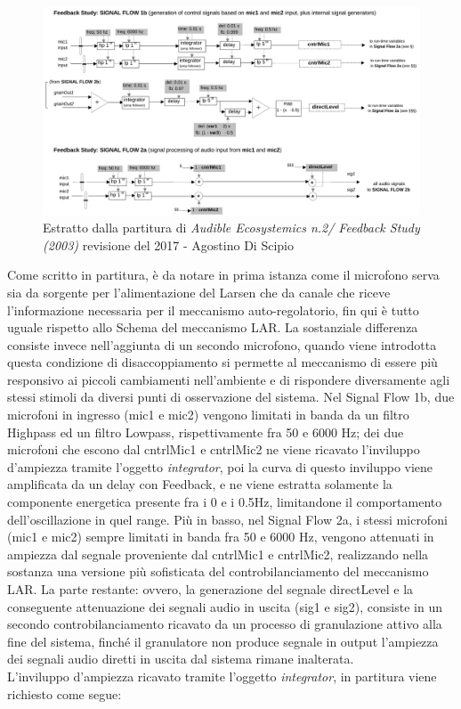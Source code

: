 \begin{figure}[h!]
\begin{center}
\includegraphics[width=14cm]{figures/LARFeedbackstudy2017.pdf}
\caption{Estratto dalla partitura di \textit{Audible Ecosystemics n.2/ Feedback Study (2003)}
revisione del 2017 - Agostino Di Scipio}
\vspace{0.5cm}
\end{center}
\end{figure}

Come scritto in partitura, è da notare in prima istanza
come il microfono serva sia da sorgente per l'alimentazione del Larsen che
da canale che riceve l'informazione necessaria per il meccanismo auto-regolatorio,
fin qui è tutto uguale rispetto allo Schema del meccanismo LAR.
La sostanziale differenza consiste invece nell'aggiunta di un secondo microfono,
quando viene introdotta questa condizione di disaccoppiamento si 
permette al meccanismo di essere più responsivo ai piccoli cambiamenti nell'ambiente
e di rispondere diversamente agli stessi stimoli da diversi punti di osservazione del sistema.
Nel Signal Flow 1b, due microfoni in ingresso (mic1 e mic2) 
vengono limitati in banda da un filtro Highpass ed 
un filtro Lowpass, rispettivamente fra 50 e 6000 Hz; dei due microfoni che escono 
dal cntrlMic1 e cntrlMic2 ne viene ricavato l'inviluppo d'ampiezza tramite
l'oggetto \textit{integrator}, poi la curva di questo inviluppo viene amplificata da 
un delay con Feedback, e ne viene estratta solamente la componente energetica 
presente fra i 0 e i 0.5Hz, limitandone il comportamento dell'oscillazione in quel range.
Più in basso, nel Signal Flow 2a, i stessi microfoni (mic1 e mic2) sempre
limitati in banda fra 50 e 6000 Hz, vengono attenuati in ampiezza dal segnale
proveniente dal cntrlMic1 e cntrlMic2, realizzando nella sostanza una 
versione più sofisticata del controbilanciamento del meccanismo LAR.
La parte restante: ovvero, la generazione del segnale directLevel e la 
conseguente attenuazione dei segnali audio in uscita (sig1 e sig2),
consiste in un secondo controbilanciamento ricavato da un processo di granulazione
attivo alla fine del sistema, finché il granulatore non produce segnale in output 
l'ampiezza dei segnali audio diretti in uscita dal sistema rimane inalterata. \\
L'inviluppo d'ampiezza ricavato tramite l'oggetto \textit{integrator}, in partitura 
viene richiesto come segue:

